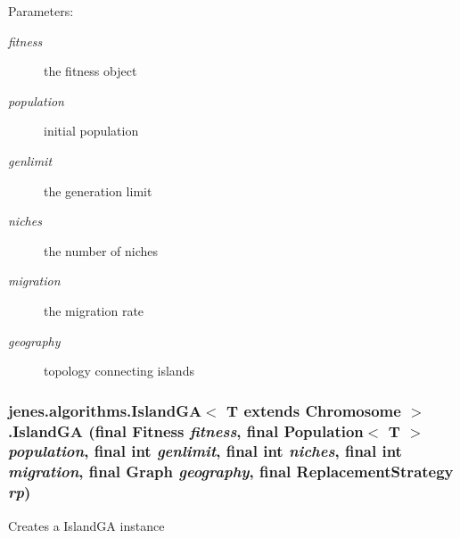 \begin{Desc}
\item[Parameters:]
\begin{description}
\item[{\em fitness}]the fitness object \item[{\em population}]initial population \item[{\em genlimit}]the generation limit \item[{\em niches}]the number of niches \item[{\em migration}]the migration rate \item[{\em geography}]topology connecting islands \end{description}
\end{Desc}
\hypertarget{classjenes_1_1algorithms_1_1_island_g_a_3_01_t_01extends_01_chromosome_01_4_1b122013a5bad475ec45c67737029e68}{
\subsubsection[IslandGA]{\setlength{\rightskip}{0pt plus 5cm}jenes.algorithms.IslandGA$<$ T extends Chromosome $>$.IslandGA (final Fitness {\em fitness}, \/  final Population$<$ T $>$ {\em population}, \/  final int {\em genlimit}, \/  final int {\em niches}, \/  final int {\em migration}, \/  final Graph {\em geography}, \/  final {\bf ReplacementStrategy} {\em rp})}}
\label{classjenes_1_1algorithms_1_1_island_g_a_3_01_t_01extends_01_chromosome_01_4_1b122013a5bad475ec45c67737029e68}


Creates a IslandGA instance

